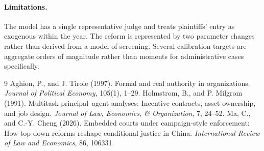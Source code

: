 \documentclass[11pt,letterpaper]{article}
\begin{document}
\paragraph{Limitations.} The model has a single representative judge and treats plaintiffs' entry as exogenous within the year. The reform is represented by two parameter changes rather than derived from a model of screening. Several calibration targets are aggregate orders of magnitude rather than moments for administrative cases specifically.


\begin{thebibliography}{9}
 Aghion, P., and J. Tirole (1997). Formal and real authority in organizations. \emph{Journal of Political Economy}, 105(1), 1--29.
 Holmstrom, B., and P. Milgrom (1991). Multitask principal--agent analyses: Incentive contracts, asset ownership, and job design. \emph{Journal of Law, Economics, \& Organization}, 7, 24--52.
 Ma, C., and C.-Y. Cheng (2026). Embedded courts under campaign-style enforcement: How top-down reforms reshape conditional justice in China. \emph{International Review of Law and Economics}, 86, 106331.
\end{thebibliography}
\end{document}
